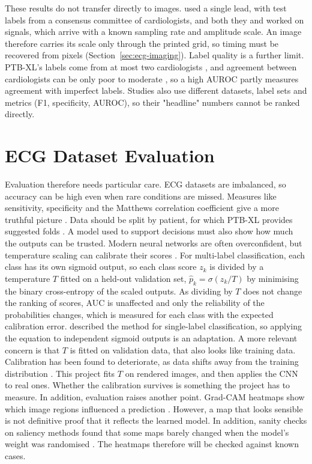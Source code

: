 These results do not transfer directly to images. \textcite{hannun_cardiologist_2019} used
a single lead, with test labels from a consensus committee of cardiologists, and both they
and \textcite{ribeiro_automatic_2020} worked on signals, which arrive with a known sampling
rate and amplitude scale. An image therefore carries its scale only through the printed grid, so timing must be recovered from pixels (Section~\ref{sec:ecg-imaging}). Label quality is a
further limit. PTB-XL's labels come from at most two cardiologists
\cite{wagner_ptbxl_2020}, and agreement between cardiologists can be only poor to moderate
\cite{dhutia_interrater_2017}, so a high AUROC partly measures agreement with imperfect labels. Studies also use different datasets, label sets and metrics (F1, specificity,
AUROC), so their "headline" numbers cannot be ranked directly.
\section{ECG Dataset Evaluation}
\label{sec:ml-eval}

Evaluation therefore needs particular care. ECG datasets are imbalanced, so accuracy can be high even when rare conditions are missed. Measures like sensitivity, specificity and the Matthews correlation coefficient give a more truthful picture %
\cite{chicco_advantages_2020}. Data should be split by patient, for which PTB-XL
provides suggested folds \cite{wagner_ptbxl_2020}. A model used to support decisions must also show how much the outputs can be trusted. Modern neural networks are often overconfident, but temperature scaling can calibrate their scores
\cite{guo_calibration_2017}. For multi-label classification, each class has its own sigmoid output, so each class score $z_k$ is divided by a temperature $T$ fitted on a held-out validation set, \(\hat{p}_k = \sigma(z_k/T)\)
by minimising the binary cross-entropy of the scaled outputs. As dividing by $T$ does
not change the ranking of scores, AUC is unaffected and only the reliability of the probabilities changes, which is measured for each class with the expected calibration error. \textcite{guo_calibration_2017} described the method for single-label classification, so applying
the equation to independent sigmoid outputs is an
adaptation. A more relevant concern is that $T$ is fitted on validation data, that also looks like training data. Calibration has been found to deteriorate, as data shifts away from the training distribution \cite{ovadia_trust_2019}. This project fits $T$ on rendered images, and then applies the CNN to real ones. Whether the calibration survives is something the project has to measure. In addition, evaluation raises another point.  Grad-CAM heatmaps show which image regions influenced a prediction
\cite{selvaraju_gradcam_2017}. However, a map that looks sensible is not definitive proof that it reflects the learned model. In addition, sanity checks on saliency methods found that some maps barely changed when the model's weight was randomised \cite{adebayo_sanity_2018}. The heatmaps therefore will be checked against known cases. 

